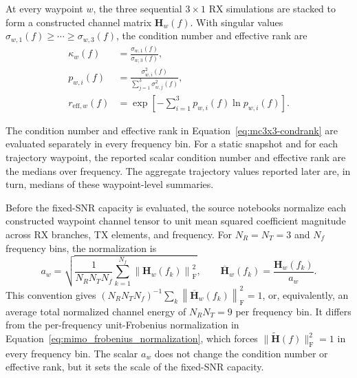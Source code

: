 At every waypoint $w$, the three sequential $3\times1$ RX simulations are stacked to form a constructed channel matrix $\mathbf{H}_w(f)$. With singular values $\sigma_{w,1}(f)\geq\cdots\geq\sigma_{w,3}(f)$, the condition number and effective rank are
\begin{equation}
    \begin{aligned}
        \kappa_w(f)&=\frac{\sigma_{w,1}(f)}{\sigma_{w,3}(f)},\\
        p_{w,i}(f)&=\frac{\sigma_{w,i}^2(f)}
        {\sum_{j=1}^{3}\sigma_{w,j}^2(f)},\\
        r_{\mathrm{eff},w}(f)&=\exp\!\left[-\sum_{i=1}^{3}
        p_{w,i}(f)\ln p_{w,i}(f)\right].
    \end{aligned}
    \label{eq:mc3x3-condrank}
\end{equation}

The condition number and effective rank in Equation~\ref{eq:mc3x3-condrank} are evaluated separately in every frequency bin. For a static snapshot and for each trajectory waypoint, the reported scalar condition number and effective rank are the medians over frequency. The aggregate trajectory values reported later are, in turn, medians of these waypoint-level summaries.

Before the fixed-SNR capacity is evaluated, the source notebooks normalize each constructed waypoint channel tensor to unit mean squared coefficient magnitude across RX branches, TX elements, and frequency. For $N_R=N_T=3$ and $N_f$ frequency bins, the normalization is
\begin{equation}
    a_w=
    \sqrt{\frac{1}{N_R N_T N_f}
    \sum_{k=1}^{N_f}\left\lVert\mathbf{H}_w(f_k)\right\rVert_{\mathrm{F}}^2},
    \qquad
    \overline{\mathbf{H}}_w(f_k)=\frac{\mathbf{H}_w(f_k)}{a_w}.
    \label{eq:mc-unit-rms-normalization}
\end{equation}
This convention gives
$\left(N_R N_T N_f\right)^{-1}\sum_k\left\lVert\overline{\mathbf{H}}_w(f_k)\right\rVert_{\mathrm{F}}^2=1$, or, equivalently, an average total normalized channel energy of $N_R N_T=9$ per frequency bin. It differs from the per-frequency unit-Frobenius normalization in Equation~\ref{eq:mimo_frobenius_normalization}, which forces $\lVert\widetilde{\mathbf{H}}(f)\rVert_{\mathrm{F}}^2=1$ in every frequency bin. The scalar $a_w$ does not change the condition number or effective rank, but it sets the scale of the fixed-SNR capacity.


